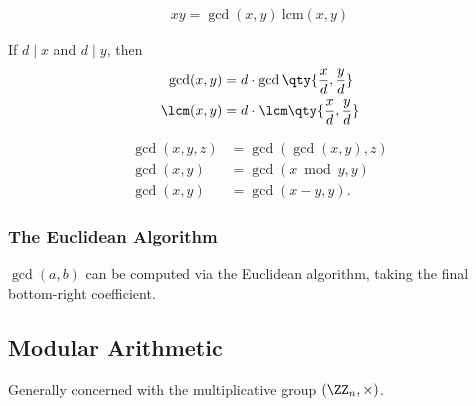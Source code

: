 \begin{proposition}

\begin{align*}
xy = \gcd{(x,y)}~\mathrm{lcm}{(x,y)}
\end{align*}

\end{proposition}

\begin{proposition}[?]

If \(d\mid x\) and \(d\mid y\), then
\begin{align*}
\gcd(x,y) &= d\cdot \gcd\qty{ \frac x d, \frac y d} \\
\lcm(x,y) &= d\cdot \lcm \qty{ \frac x d, \frac y d}
\end{align*} 

\end{proposition}

\begin{proposition}

\begin{align*}  
\gcd(x, y, z) &= \gcd(\gcd(x,y), z) \\
\gcd(x, y)    &= \gcd(x\bmod y, y) \\
\gcd(x,y)     &= \gcd(x-y, y)
.\end{align*}

\end{proposition}

\hypertarget{the-euclidean-algorithm}{%
\subsubsection{The Euclidean Algorithm}\label{the-euclidean-algorithm}}

\(\gcd(a, b)\) can be computed via the Euclidean algorithm, taking the
final bottom-right coefficient.


\hypertarget{modular-arithmetic}{%
\subsection{Modular Arithmetic}\label{modular-arithmetic}}

Generally concerned with the multiplicative group \((\ZZ_n, \times)\).

